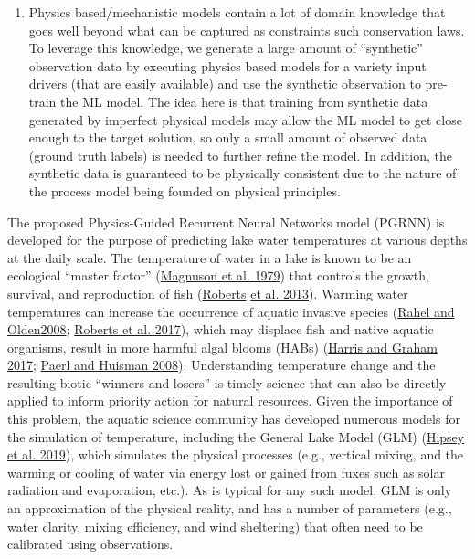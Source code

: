 \documentclass[book.tex]{subfiles}
\begin{document}
\begin{enumerate}
\item
  
  Physics based/mechanistic models contain a lot of domain knowledge
  that goes well beyond what can be captured as constraints such
  conservation laws. To leverage this knowledge, we generate a large
  amount of ``synthetic'' observation data by executing physics based
  models for a variety input drivers (that are easily available) and use
  the synthetic observation to pre-train the ML model. The idea here is
  that training from synthetic data generated by imperfect physical
  models may allow the ML model to get close enough to the target
  solution, so only a small amount of observed data (ground truth
  labels) is needed to further refine the model. In addition, the
  synthetic data is guaranteed to be physically consistent due to the
  nature of the process model being founded on physical principles.
  
\end{enumerate}


The proposed Physics-Guided Recurrent Neural Networks model (PGRNN) is
developed for the purpose of predicting lake water temperatures at
various depths at the daily scale. The temperature of water in a lake is
known to be an ecological ``master factor''
(\protect\hyperlink{page23}{Magnuson et al. 1979}) that controls the
growth, survival, and reproduction of fish
(\protect\hyperlink{page24}{Roberts} \protect\hyperlink{page24}{et al.
2013}). Warming water temperatures can increase the occurrence of
aquatic invasive species (\protect\hyperlink{page24}{Rahel and Olden}\protect\hyperlink{page24}{2008}; \protect\hyperlink{page24}{Roberts et
al. 2017}), which may displace fish and native aquatic organisms,
result in more harmful algal blooms (HABs)
(\protect\hyperlink{page23}{Harris and Graham 2017};
\protect\hyperlink{page24}{Paerl and Huisman 2008}). Understanding
temperature change and the resulting biotic ``winners and losers'' is
timely science that can also be directly applied to inform priority
action for natural resources. Given the importance of this problem, the
aquatic science community has developed numerous models for the
simulation of temperature, including the General Lake Model (GLM)
(\protect\hyperlink{page23}{Hipsey et al. 2019}), which simulates the
physical processes (e.g., vertical mixing, and the warming or cooling of
water via energy lost or gained from fuxes such as solar radiation and
evaporation, etc.). As is typical for any such model, GLM is only an
approximation of the physical reality, and has a number of parameters
(e.g., water clarity, mixing efficiency, and wind sheltering) that often
need to be calibrated using observations.
\end{document}
